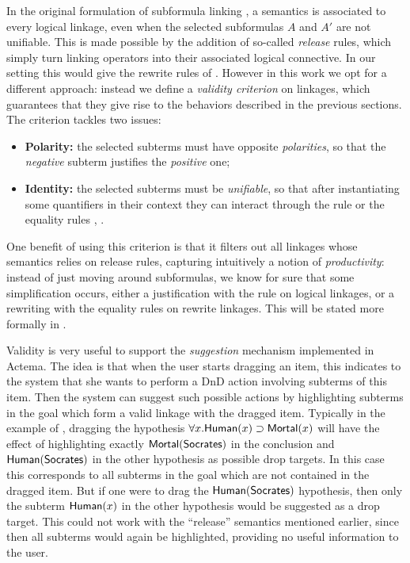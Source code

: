 In the original formulation of subformula linking , a
semantics is associated to every logical linkage, even when the selected
subformulas $A$ and $A'$ are not unifiable. This is made possible by the
addition of so-called \emph{release} rules, which simply turn linking operators into their
associated logical connective. In our setting this would give the rewrite rules
of . However in this work we opt for a different approach:
instead we define a \emph{validity criterion} on linkages, which guarantees that
they give rise to the behaviors described in the previous sections. The
criterion tackles two issues:
\begin{itemize}
  \item \textbf{Polarity:} the selected subterms must have opposite
  \emph{polarities}, so that the \emph{negative} subterm justifies the
  \emph{positive} one;
  \item \textbf{Identity:} the selected subterms must be \emph{unifiable}, so
  that after instantiating some quantifiers in their context they can interact
  through the {} rule or the equality rules {,
  }.
\end{itemize}
One benefit of using this criterion is that it filters out all linkages whose
semantics relies on release rules, capturing intuitively a notion of
\emph{productivity}: instead of just moving around subformulas, we know for sure
that some simplification occurs, either a justification with the {}
rule on logical linkages, or a rewriting with the equality rules on rewrite
linkages. This will be stated more formally in .

Validity is very useful to support the \emph{suggestion} mechanism implemented
in Actema. The idea is that when the user starts dragging an item, this
indicates to the system that she wants to perform a DnD action involving
subterms of this item. Then the system can suggest such possible actions by
highlighting subterms in the goal which form a valid linkage with the dragged
item. Typically in the example of , dragging the hypothesis
$\forall x. \mbox{\textsf{Human}}(x) \supset \mbox{\textsf{Mortal}}(x)$ will have the effect of highlighting
exactly $\mbox{\textsf{Mortal}}(\mbox{\textsf{Socrates}})$ in the conclusion and $\mbox{\textsf{Human}}(\mbox{\textsf{Socrates}})$ in the
other hypothesis as possible drop targets. In this case this corresponds to all
subterms in the goal which are not contained in the dragged item. But if one
were to drag the $\mbox{\textsf{Human}}(\mbox{\textsf{Socrates}})$ hypothesis, then only the subterm
$\mbox{\textsf{Human}}(x)$ in the other hypothesis would be suggested as a drop target. This
could not work with the ``release'' semantics mentioned earlier, since then all
subterms would again be highlighted, providing no useful information to the
user.

